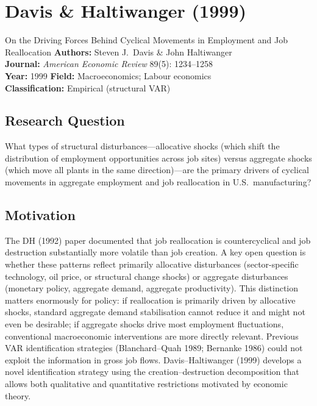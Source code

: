\chapter{Davis \& Haltiwanger (1999)}

\begin{paperbox}{On the Driving Forces Behind Cyclical Movements in Employment
and Job Reallocation}
\textbf{Authors:} Steven J.\ Davis \& John Haltiwanger\\[3pt]
\textbf{Journal:} \textit{American Economic Review} 89(5): 1234--1258\\[3pt]
\textbf{Year:} 1999 \quad\textbf{Field:} Macroeconomics; Labour economics\\[3pt]
\textbf{Classification:} Empirical (structural VAR)
\end{paperbox}

\section{Research Question}

What types of structural disturbances---allocative shocks (which shift the
distribution of employment opportunities across job sites) versus aggregate
shocks (which move all plants in the same direction)---are the primary drivers
of cyclical movements in aggregate employment and job reallocation in U.S.\
manufacturing?

\section{Motivation}

The DH (1992) paper documented that job reallocation is countercyclical and
job destruction substantially more volatile than job creation. A key open
question is whether these patterns reflect primarily allocative disturbances
(sector-specific technology, oil price, or structural change shocks) or
aggregate disturbances (monetary policy, aggregate demand, aggregate
productivity). This distinction matters enormously for policy: if reallocation
is primarily driven by allocative shocks, standard aggregate demand
stabilisation cannot reduce it and might not even be desirable; if aggregate
shocks drive most employment fluctuations, conventional macroeconomic
interventions are more directly relevant. Previous VAR identification
strategies (Blanchard--Quah 1989; Bernanke 1986) could not exploit the
information in gross job flows. Davis--Haltiwanger (1999) develops a novel
identification strategy using the creation--destruction decomposition that
allows both qualitative and quantitative restrictions motivated by economic
theory.

